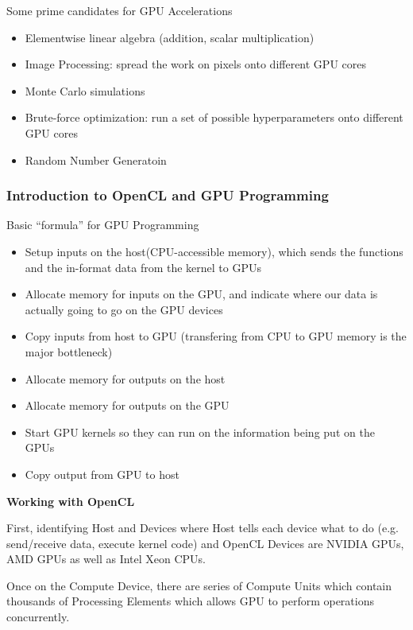 \documentclass{article}
\begin{document}
Some prime candidates for GPU Accelerations

\begin{itemize}
    \item Elementwise linear algebra (addition, scalar multiplication)
    \item Image Processing: spread the work on pixels onto different GPU cores
    \item Monte Carlo simulations
    \item Brute-force optimization: run a set of possible hyperparameters onto different GPU cores
    \item Random Number Generatoin
\end{itemize}

\subsubsection{Introduction to OpenCL and GPU Programming}

Basic ``formula'' for GPU Programming

\begin{itemize}
    \item Setup inputs on the host(CPU-accessible memory), which sends the functions and the in-format data from the kernel to GPUs
    \item Allocate memory for inputs on the GPU, and indicate where our data is actually going to go on the GPU devices
    \item Copy inputs from host to GPU (transfering from CPU to GPU memory is the major bottleneck)
    \item Allocate memory for outputs on the host
    \item Allocate memory for outputs on the GPU
    \item Start GPU kernels so they can run on the information being put on the GPUs
    \item Copy output from GPU to host
\end{itemize}

\textbf{Working with OpenCL}

First, identifying Host and Devices where Host tells each device what to do (e.g. send/receive data, execute kernel code) and OpenCL Devices are NVIDIA GPUs, AMD GPUs as well as Intel Xeon CPUs.

Once on the Compute Device, there are series of Compute Units which contain thousands of Processing Elements which allows GPU to perform operations concurrently.
\end{document}
